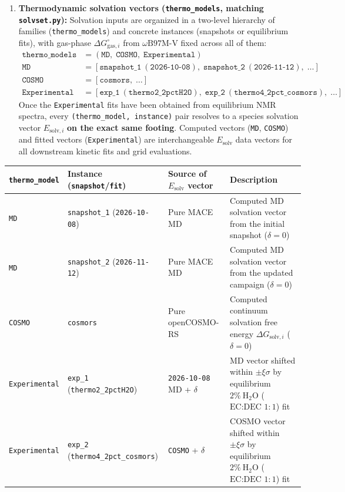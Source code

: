 \documentclass[11pt,a4paper]{article}
\begin{document}
\begin{enumerate}[leftmargin=1.8em]
    \item \textbf{Thermodynamic solvation vectors (\texttt{thermo\_models}, matching \texttt{solvset.py}):}
    Solvation inputs are organized in a two-level hierarchy of families (\texttt{thermo\_models}) and concrete instances (snapshots or equilibrium fits), with gas-phase $\Delta G_{\text{gas}, i}^\circ$ from $\omega\text{B97M-V}$ fixed across all of them:
    \begin{align*}
        \texttt{thermo\_models} &= (\texttt{MD},\; \texttt{COSMO},\; \texttt{Experimental}) \\
        \texttt{MD} &= [\texttt{snapshot\_1}\ (\texttt{2026-10-08}),\; \texttt{snapshot\_2}\ (\texttt{2026-11-12}),\; \dots] \\
        \texttt{COSMO} &= [\texttt{cosmors},\; \dots] \\
        \texttt{Experimental} &= [\texttt{exp\_1}\ (\texttt{thermo2\_2pctH2O}),\; \texttt{exp\_2}\ (\texttt{thermo4\_2pct\_cosmors}),\; \dots]
    \end{align*}
    Once the \texttt{Experimental} fits have been obtained from equilibrium NMR spectra, every \texttt{(thermo\_model, instance)} pair resolves to a species solvation vector $E_{\text{solv}, i}$ \textbf{on the exact same footing}. Computed vectors (\texttt{MD}, \texttt{COSMO}) and fitted vectors (\texttt{Experimental}) are interchangeable $E_{\text{solv}}$ data vectors for all downstream kinetic fits and grid evaluations.
\end{enumerate}

\begin{table}[h!]
\centering
\small
\begin{tabularx}{\linewidth}{@{}L{2.1cm}L{4.4cm}L{2.8cm}Y@{}}
\toprule
\textbf{\texttt{thermo\_model}} & \textbf{Instance (\texttt{snapshot}/\texttt{fit})} & \textbf{Source of $E_{\text{solv}}$ vector} & \textbf{Description} \\
\midrule
\texttt{MD} & \texttt{snapshot\_1} (\texttt{2026-10-08}) & Pure MACE MD & Computed MD solvation vector from the initial snapshot ($\delta = 0$) \\
\texttt{MD} & \texttt{snapshot\_2} (\texttt{2026-11-12}) & Pure MACE MD & Computed MD solvation vector from the updated campaign ($\delta = 0$) \\
\texttt{COSMO} & \texttt{cosmors} & Pure openCOSMO-RS & Computed continuum solvation free energy $\Delta G_{\text{solv}, i}$ ($\delta = 0$) \\
\texttt{Experimental} & \texttt{exp\_1} (\texttt{thermo2\_2pctH2O}) & \texttt{2026-10-08} MD + $\delta$ & MD vector shifted within $\pm\xi\sigma$ by equilibrium $2\%\ \text{H}_2\text{O}$ ($\text{EC:DEC } 1:1$) fit \\
\texttt{Experimental} & \texttt{exp\_2} (\texttt{thermo4\_2pct\_cosmors}) & \texttt{COSMO} + $\delta$ & COSMO vector shifted within $\pm\xi\sigma$ by equilibrium $2\%\ \text{H}_2\text{O}$ ($\text{EC:DEC } 1:1$) fit \\
\bottomrule
\end{tabularx}
\end{table}
\end{document}
